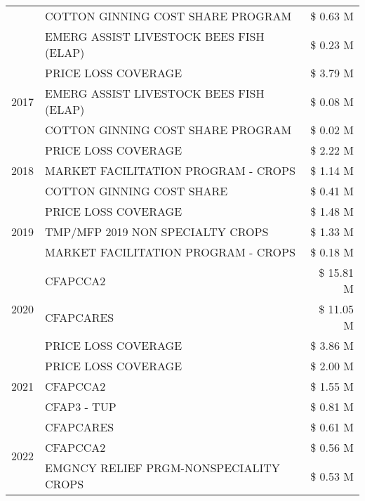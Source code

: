\begin{tabular}{llr}
 & COTTON GINNING COST SHARE PROGRAM & \$ 0.63 M \\
 & EMERG ASSIST LIVESTOCK BEES FISH (ELAP) & \$ 0.23 M \\
\cline{1-3}
\multirow[t]{3}{*}{2017} & PRICE LOSS COVERAGE & \$ 3.79 M \\
 & EMERG ASSIST LIVESTOCK BEES FISH (ELAP) & \$ 0.08 M \\
 & COTTON GINNING COST SHARE PROGRAM & \$ 0.02 M \\
\cline{1-3}
\multirow[t]{3}{*}{2018} & PRICE LOSS COVERAGE & \$ 2.22 M \\
 & MARKET FACILITATION PROGRAM - CROPS & \$ 1.14 M \\
 & COTTON GINNING COST SHARE & \$ 0.41 M \\
\cline{1-3}
\multirow[t]{3}{*}{2019} & PRICE LOSS COVERAGE & \$ 1.48 M \\
 & TMP/MFP 2019 NON SPECIALTY CROPS & \$ 1.33 M \\
 & MARKET FACILITATION PROGRAM - CROPS & \$ 0.18 M \\
\cline{1-3}
\multirow[t]{3}{*}{2020} & CFAPCCA2 & \$ 15.81 M \\
 & CFAPCARES & \$ 11.05 M \\
 & PRICE LOSS COVERAGE & \$ 3.86 M \\
\cline{1-3}
\multirow[t]{3}{*}{2021} & PRICE LOSS COVERAGE & \$ 2.00 M \\
 & CFAPCCA2 & \$ 1.55 M \\
 & CFAP3 - TUP & \$ 0.81 M \\
\cline{1-3}
\multirow[t]{3}{*}{2022} & CFAPCARES & \$ 0.61 M \\
 & CFAPCCA2 & \$ 0.56 M \\
 & EMGNCY RELIEF PRGM-NONSPECIALITY CROPS & \$ 0.53 M \\
\cline{1-3}
\bottomrule
\end{tabular}
